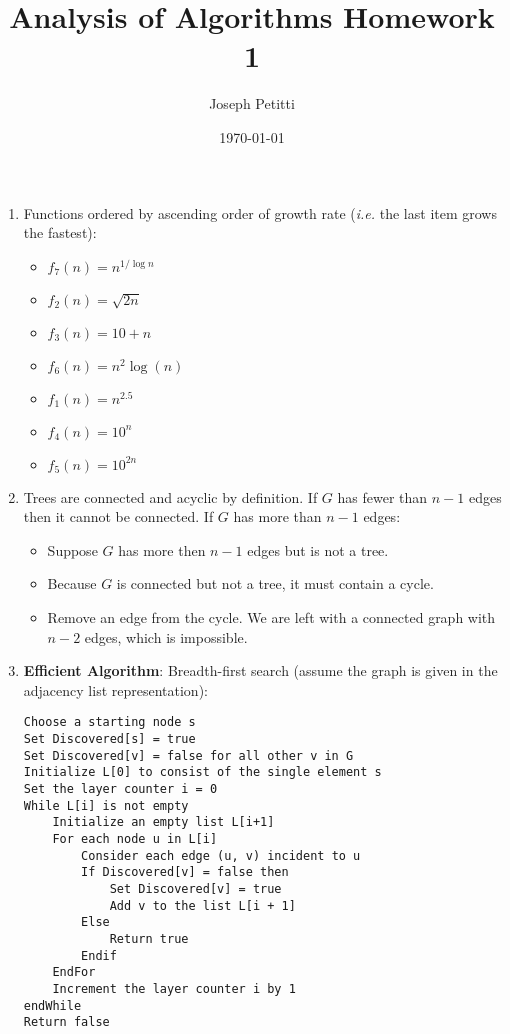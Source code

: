 \documentclass[a4paper, 10pt]{article}
\title{Analysis of Algorithms Homework 1}
\author{Joseph Petitti}
\date{\today}
\begin{document}
\maketitle

\begin{enumerate}
	\item Functions ordered by ascending order of growth rate (\textit{i.e.} the
		last item grows the fastest):
		\begin{itemize}
			\item $f_7(n) = n^{1 / \log n}$
			\item $f_2(n) = \sqrt{2n}$
			\item $f_3(n) = 10 + n$
			\item $f_6(n) = n^2 \log (n)$
			\item $f_1(n) = n^{2.5}$
			\item $f_4(n) = 10^{n}$
			\item $f_5(n) = 10^{2n}$
		\end{itemize}

	\item Trees are connected and acyclic by definition. If $G$ has fewer than
		$n - 1$ edges then it cannot be connected. If $G$ has more than $n - 1$
		edges:
		\begin{itemize}
			\item Suppose $G$ has more then $n - 1$ edges but  is not a tree.
			\item Because $G$ is connected but not a tree, it must contain a
				cycle.
			\item Remove an edge from the cycle. We are left with a connected
				graph with $n-2$ edges, which is impossible.
		\end{itemize}

	\item \textbf{Efficient Algorithm}: Breadth-first search (assume the graph
		is given in the adjacency list representation):

\begin{lstlisting}
Choose a starting node s
Set Discovered[s] = true
Set Discovered[v] = false for all other v in G
Initialize L[0] to consist of the single element s
Set the layer counter i = 0
While L[i] is not empty
	Initialize an empty list L[i+1]
	For each node u in L[i]
		Consider each edge (u, v) incident to u
		If Discovered[v] = false then
			Set Discovered[v] = true
			Add v to the list L[i + 1]
		Else
			Return true
		Endif
	EndFor
	Increment the layer counter i by 1
endWhile
Return false
\end{lstlisting}


\end{enumerate}
\end{document}
